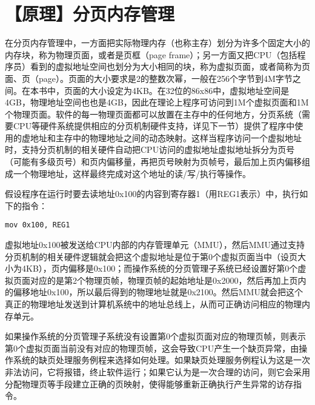 \section{【原理】分页内存管理}\label{ux539fux7406ux5206ux9875ux5185ux5b58ux7ba1ux7406}

在分页内存管理中，一方面把实际物理内存（也称主存）划分为许多个固定大小的内存块，称为物理页面，或者是页框（page
frame）；另一方面又把CPU（包括程序员）看到的虚拟地址空间也划分为大小相同的块，称为虚拟页面，或者简称为页面、页（page）。页面的大小要求是2的整数次幂，一般在256个字节到4M字节之间。在本书中，页面的大小设定为4KB。在32位的86x86中，虚拟地址空间是4GB，物理地址空间也也是4GB，因此在理论上程序可访问到1M个虚拟页面和1M个物理页面。软件的每一物理页面都可以放置在主存中的任何地方，分页系统（需要CPU等硬件系统提供相应的分页机制硬件支持，详见下一节）提供了程序中使用的虚地址和主存中的物理地址之间的动态映射。这样当程序访问一个虚拟地址时，支持分页机制的相关硬件自动把CPU访问的虚拟地址虚拟地址拆分为页号（可能有多级页号）和页内偏移量，再把页号映射为页帧号，最后加上页内偏移组成一个物理地址，这样最终完成对这个地址的读/写/执行等操作。

假设程序在运行时要去读地址0x100的内容到寄存器1（用REG1表示）中，执行如下的指令：

\begin{lstlisting}
mov 0x100, REG1
\end{lstlisting}

虚拟地址0x100被发送给CPU内部的内存管理单元（MMU），然后MMU通过支持分页机制的相关硬件逻辑就会把这个虚拟地址是位于第0个虚拟页面当中（设页大小为4KB），页内偏移是0x100；而操作系统的分页管理子系统已经设置好第0个虚拟页面对应的是第2个物理页帧，物理页帧的起始地址是0x2000，然后再加上页内的偏移地址0x100，所以最后得到的物理地址就是0x2100。然后MMU就会把这个真正的物理地址发送到计算机系统中的地址总线上，从而可正确访问相应的物理内存单元。

如果操作系统的分页管理子系统没有设置第0个虚拟页面对应的物理页帧，则表示第0个虚拟页面当前没有对应的物理页帧，这会导致CPU产生一个缺页异常，由操作系统的缺页处理服务例程来选择如何处理。如果缺页处理服务例程认为这是一次非法访问，它将报错，终止软件运行；如果它认为是一次合理的访问，则它会采用分配物理页等手段建立正确的页映射，使得能够重新正确执行产生异常的访存指令。
